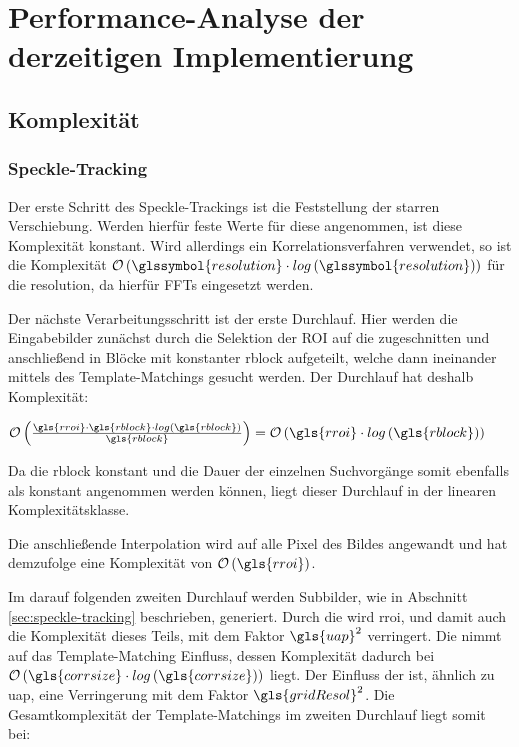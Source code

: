 \chapter{Performance-Analyse der derzeitigen Implementierung}

\section{Komplexität}

\subsection{Speckle-Tracking}

Der erste Schritt des Speckle-Trackings ist die Feststellung der starren Verschiebung. Werden hierfür feste Werte für diese angenommen, ist diese Komplexität konstant. Wird allerdings ein Korrelationsverfahren verwendet, so ist die Komplexität $\mathcal{O}\left(\glssymbol{resolution} \cdot log\left(\glssymbol{resolution}\right)\right)$ für die \gls{resolution}, da hierfür \glspl{FFT} eingesetzt werden. 

Der nächste Verarbeitungsschritt ist der erste Durchlauf. Hier werden die Eingabebilder zunächst durch die Selektion der \gls{ROI} auf die   zugeschnitten und anschließend in Blöcke mit konstanter \gls{rblock} aufgeteilt, welche dann ineinander mittels des Template-Matchings gesucht werden. Der Durchlauf hat deshalb Komplexität: 

\begin{center}
	$\mathcal{O}\left(\frac{\gls{rroi} \cdot \gls{rblock} \cdot log\left(\gls{rblock}\right)}{\gls{rblock}}\right) = \mathcal{O}\left(\gls{rroi} \cdot log\left(\gls{rblock}\right)\right)$
\end{center}

Da die \gls{rblock} konstant und die Dauer der einzelnen Suchvorgänge somit ebenfalls als konstant angenommen werden können, liegt dieser Durchlauf in der linearen Komplexitätsklasse. 

Die anschließende Interpolation wird auf alle Pixel des Bildes angewandt und hat demzufolge eine Komplexität von $\mathcal{O}\left(\gls{rroi}\right)$.

Im darauf folgenden zweiten Durchlauf werden Subbilder, wie in Abschnitt \ref{sec:speckle-tracking} beschrieben, generiert. Durch die   wird \gls{rroi}, und damit auch die Komplexität dieses Teils, mit dem Faktor $\gls{uap}^2$ verringert. Die   nimmt auf das Template-Matching Einfluss, dessen Komplexität dadurch bei $\mathcal{O}\left(\gls{corrsize} \cdot log\left(\gls{corrsize}\right)\right)$ liegt. Der Einfluss der   ist, ähnlich zu \gls{uap}, eine Verringerung mit dem Faktor $\gls{gridResol}^2$. Die Gesamtkomplexität der Template-Matchings im zweiten Durchlauf liegt somit bei:

